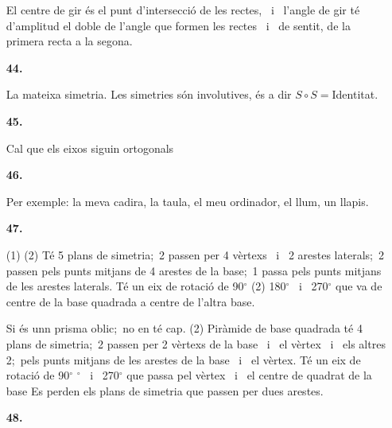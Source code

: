 \documentclass{book}
\newenvironment{pageandsol}[3][]{
\def\nonotes{#1}

\newpage

\heading{Solucions de la pàgina #3:}
\normalfont
	\vspace{0.25cm}
}{
\vspace{0.25cm}

}
\begin{document}
\begin{pageandsol}{136}{134}
\begin{enumerate}
El centre de gir és el punt d'intersecció de les rectes, \, i \, l'angle de gir té d'amplitud el doble de l'angle que formen les rectes \, i \, de sentit, de la primera recta a la segona.
\mbox{}\vspace{0.25cm}

\item[\fontfamily{phv}\selectfont\large\color{blue}\textbf{44. }] 

La mateixa simetria. Les simetries són involutives, és a dir $S \circ S=$Identitat.
\mbox{}\vspace{0.25cm}

\item[\fontfamily{phv}\selectfont\large\color{blue}\textbf{45. }] 

Cal que els eixos siguin ortogonals
\mbox{}\vspace{0.25cm}

\item[\fontfamily{phv}\selectfont\large\color{blue}\textbf{46. }] 

 Per exemple: la meva cadira, la taula, el meu ordinador, el llum, un llapis.
\mbox{}\vspace{0.25cm}

\item[\fontfamily{phv}\selectfont\large\color{blue}\textbf{47. }] 

 \begin{tasks}[label-format=\bfseries\large](1)
	 \task*(2) Té 5 plans de simetria;\, 2 passen per 4 vèrtexs \, i \, 2 arestes laterals;\, 2 passen pels punts mitjans de 4 arestes de la base;\, 1 passa pels punts mitjans de les arestes laterals. Té un eix de rotació de 90$^\circ $
	 \task*(2) 180$^\circ $ \, i \, 270$^\circ $ que va de centre de la base quadrada a centre de l'altra base. \par Si és unn prisma oblic;\, no en té cap.
	 \task*(2) Piràmide de base quadrada té 4 plans de simetria;\, 2 passen per 2 vèrtexs de la base \, i \, el vèrtex \, i \, els altres 2;\, pels punts mitjans de les arestes de la base \, i \, el vèrtex. Té un eix de rotació de 90$^\circ $
	 $^\circ $ \, i \, 270$^\circ $ que passa pel vèrtex \, i \, el centre de quadrat de la base
	 \task Es perden els plans de simetria que passen per dues arestes. 
\end{tasks}

\mbox{}\vspace{0.25cm}
\item[\fontfamily{phv}\selectfont\large\color{blue}\textbf{48. }] 


\end{enumerate}
\end{pageandsol}
\end{document}
